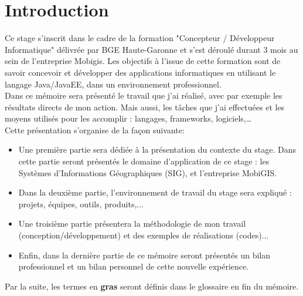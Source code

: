 \chapter{Introduction} 
\label{Introduction}

Ce stage s'inscrit dans le cadre de la formation "Concepteur / Développeur Informatique" délivrée par BGE Haute-Garonne et s'est déroulé durant 3 mois au sein de l'entreprise Mobigis. Les objectifs à l'issue de cette formation sont de savoir concevoir et développer des applications informatiques en utilisant le langage Java/JavaEE, dans un environnement professionnel.\\

Dans ce mémoire sera présenté le travail que j'ai réalisé, avec par exemple les résultats directs de mon action. Mais aussi, les tâches que j'ai effectuées et les moyens utilisés pour les accomplir : langages, frameworks, logiciels,…\\
 
Cette présentation s'organise de la façon suivante:\newline

\begin{itemize}
\item Une première partie sera dédiée à la présentation du contexte du stage. Dans cette partie seront présentés le domaine d'application de ce stage : les Systèmes d'Informations Géographiques (SIG), et l'entreprise MobiGIS.\\

\item Dans la deuxième partie, l'environnement de travail du stage sera expliqué : projets, équipes, outils, produits,...\\

\item Une troisième partie présentera la méthodologie de mon travail (conception/développement) et des exemples de réalisations (codes)...\\

\item Enfin, dans la dernière partie de ce mémoire seront présentés un bilan professionnel et un bilan personnel de cette nouvelle expérience.\newline

\end{itemize}

Par la suite, les termes en \textbf{gras} seront définis dans le glossaire en fin du mémoire.

